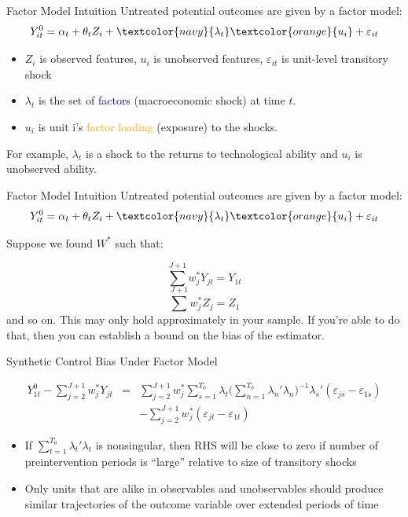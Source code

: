 \documentclass{beamer}
\begin{document}
\begin{frame}{Factor Model Intuition}
  Untreated potential outcomes are given by a factor model:
  \begin{equation}\label{eq:untreated_po}
    Y_{it}^0 = \alpha_t + \theta_t Z_i + \textcolor{navy}{\lambda_t} \textcolor{orange}{u_i} + \varepsilon_{it}
  \end{equation}

  \begin{itemize}
 \item $Z_i$ is observed features, $u_i$ is unobserved features, $\varepsilon_{it}$ is unit-level transitory shock
    \item $\lambda_t$ is the set of \textcolor{navy}{factors} (macroeconomic shock) at time $t$.
    \item $u_i$ is unit i's \textcolor{orange}{factor loading} (exposure) to the shocks.
  \end{itemize}

  For example, $\lambda_t$ is a shock to the returns to technological ability and $u_i$ is unobserved ability.
\end{frame}


\begin{frame}{Factor Model Intuition}
  Untreated potential outcomes are given by a factor model:
  \begin{equation}\label{eq:untreated_po}
    Y_{it}^0 = \alpha_t + \theta_t Z_i + \textcolor{navy}{\lambda_t} \textcolor{orange}{u_i} + \varepsilon_{it}
  \end{equation}


Suppose we found $W^*$ such that:

 $$\sum^{J+1}w^*_jY_{jt}=Y_{1t}$$ $$\sum^{J+1}w^*_jZ_{j}=Z_{1}$$ and so on. This may only hold approximately in your sample. If you're able to do that, then you can establish a bound on the bias of the estimator.

\end{frame}


\begin{frame}{Synthetic Control Bias Under Factor Model}

\begin{eqnarray*}
  Y^0_{1t} - \sum^{J+1}_{j=2}w^*_jY_{jt} &=& \sum_{j=2}^{J+1} w_j^* \sum_{s=1}^{T_0} \lambda_t \bigg ( \sum_{n=1}^{T_0} \lambda_n'\lambda_n \bigg )
  ^{-1} \lambda_s'(\varepsilon_{js} - \varepsilon_{1s} ) \\
  && - \sum_{j=2}^{J+1} w_j^* (\varepsilon_{jt} - \varepsilon_{1t})
\end{eqnarray*}

\begin{itemize}
  \item If $\sum_{t=1}^{T_0} \lambda_t' \lambda_t$ is nonsingular, then RHS will be close to zero if number of preintervention periods is ``large''  relative to size of transitory shocks 
  \item Only units that are alike in observables and unobservables should produce similar trajectories of the outcome variable over extended periods of time
\end{itemize}

\end{frame}
\end{document}
